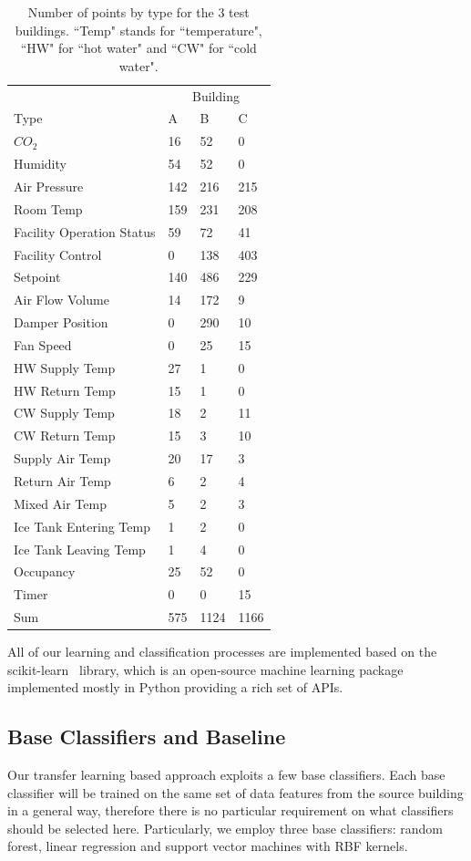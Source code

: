 \begin{table}[t]
\centering
\begin{tabular}{l | l l l}
\hline
& \multicolumn{3}{c}{Building} \\
Type & A & B & C\\
\hline\hline
$CO_{2}$ & 16 & 52 & 0\\
Humidity & 54 & 52 & 0\\
Air Pressure & 142 & 216 & 215\\
Room Temp & 159 & 231 & 208\\
Facility Operation Status & 59 & 72 & 41\\
Facility Control & 0 & 138 & 403\\
Setpoint & 140 & 486 & 229\\
Air Flow Volume & 14 & 172 & 9\\
Damper Position & 0 & 290 & 10\\
Fan Speed & 0 & 25 & 15\\
HW Supply Temp & 27 & 1 & 0\\
HW Return Temp & 15 & 1 & 0\\
CW Supply Temp & 18 & 2 & 11\\
CW Return Temp & 15 & 3 & 10\\
Supply Air Temp & 20 & 17 & 3\\
Return Air Temp & 6 & 2 & 4\\
Mixed Air Temp & 5 & 2 & 3\\
Ice Tank Entering Temp & 1 & 2 & 0\\
Ice Tank Leaving Temp & 1 & 4 & 0\\
Occupancy & 25 & 52 & 0\\
Timer & 0 & 0 & 15\\ \hline
Sum & 575 & 1124 & 1166\\ \hline
\end{tabular}
\caption{Number of points by type for the 3 test buildings. ``Temp" stands for ``temperature", ``HW" for ``hot water" and ``CW" for ``cold water".}
\label{table:num}
\end{table}


All of our learning and classification processes are implemented based on the scikit-learn~\cite{scikit} library, which is an open-source machine learning package 
implemented mostly in Python providing a rich set of APIs.

\subsection{Base Classifiers and Baseline}
\label{sec:baseline}
Our transfer learning based approach exploits a few base classifiers. Each base classifier will be trained on the same set of data features from the source building in a general way, therefore there is no particular requirement on what classifiers should be selected here.
Particularly, we employ three base classifiers: random forest, linear regression and support vector machines with RBF kernels.


